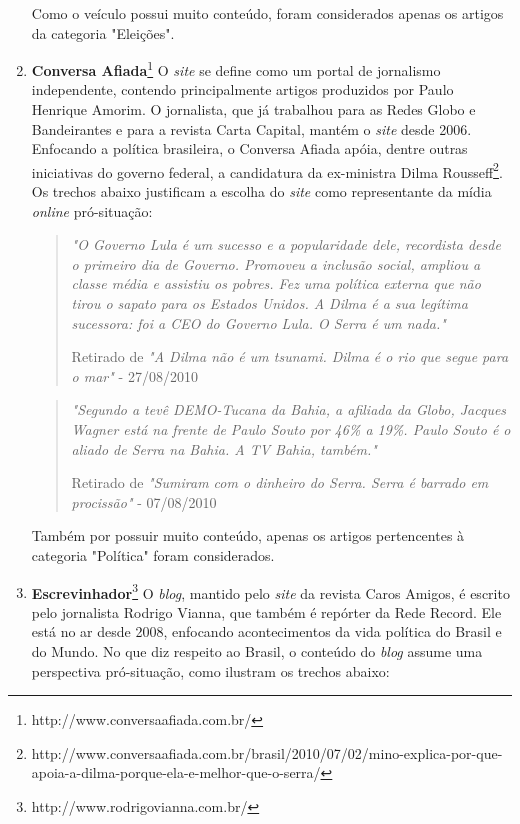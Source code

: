 \begin{enumerate}
Como o veículo possui muito conteúdo, foram considerados apenas os artigos da categoria "Eleições".  

\item \textbf{Conversa Afiada}\footnote{http://www.conversaafiada.com.br/} O \emph{site} se define como um portal de jornalismo independente, contendo principalmente artigos produzidos por Paulo Henrique Amorim. O jornalista, que já trabalhou para as Redes Globo e Bandeirantes e para a revista Carta Capital, mantém o \emph{site} desde 2006. Enfocando a política brasileira, o Conversa Afiada apóia, dentre outras iniciativas do governo federal, a candidatura da ex-ministra Dilma Rousseff\footnote{http://www.conversaafiada.com.br/brasil/2010/07/02/mino-explica-por-que-apoia-a-dilma-porque-ela-e-melhor-que-o-serra/}. Os trechos abaixo justificam a escolha do \emph{site} como representante da mídia \emph{online} pró-situação:

\begin{quote}

\emph{"O Governo Lula é um sucesso e a popularidade dele, recordista desde o primeiro dia de Governo. Promoveu a inclusão social, ampliou a classe média e assistiu os pobres. Fez uma política externa que não tirou o sapato para os Estados Unidos. A Dilma é a sua legítima sucessora: foi a CEO do Governo Lula. O Serra é um nada."}

{\small Retirado de \emph{"A Dilma não é um tsunami. Dilma é o rio que segue para o mar"} - 27/08/2010}
\end{quote}

\begin{quote}

\emph{"Segundo a tevê DEMO-Tucana da Bahia, a afiliada da Globo, Jacques Wagner está na frente de Paulo Souto por 46\% a 19\%. Paulo Souto é o aliado de Serra na Bahia. A TV Bahia, também."}

{\small Retirado de \emph{"Sumiram com o dinheiro do Serra. Serra é barrado em procissão"} - 07/08/2010}
\end{quote}


Também por possuir muito conteúdo, apenas os artigos pertencentes à categoria "Política"  foram considerados.

\item \textbf{Escrevinhador}\footnote{http://www.rodrigovianna.com.br/} O \emph{blog}, mantido pelo \emph{site} da revista Caros Amigos, é escrito pelo jornalista Rodrigo Vianna, que também é repórter da Rede Record. Ele está no ar desde 2008, enfocando acontecimentos da vida política do Brasil e do Mundo. No que diz respeito ao Brasil, o conteúdo do \emph{blog} assume uma perspectiva pró-situação, como ilustram os trechos abaixo:


\end{enumerate}
